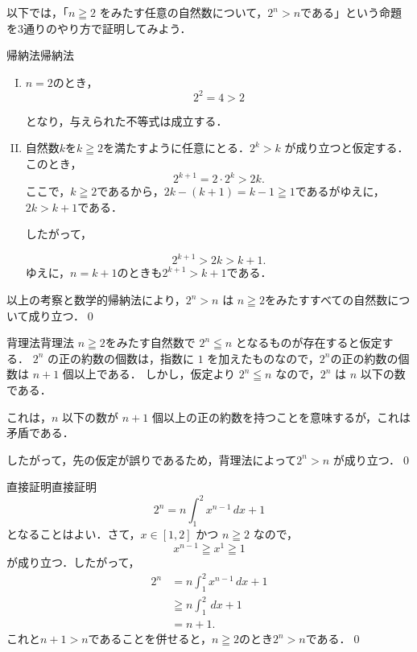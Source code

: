 \documentclass[a4paper,11pt]{ltjsarticle}
\renewcommand{\geq}{\geqq}
\begin{document}
    以下では，「$n \geq 2$ をみたす任意の自然数について，$2^n > n$である」という命題を3通りのやり方で証明してみよう．

    \begin{example}{帰納法}{帰納法}
      \begin{enumerate}[(I)]
      \item $n=2$のとき，
      \[
      2^2 = 4 > 2
      \]
      
      となり，与えられた不等式は成立する．
      \item 自然数$k$を$k \geqq 2$を満たすように任意にとる．$2^k > k$ が成り立つと仮定する．このとき，
      \[
      2^{k+1} = 2 \cdot 2^k > 2k.
      \]
      ここで，$k \geqq 2$であるから，$2k - (k + 1) = k - 1 \geq 1$であるがゆえに，$2k > k + 1$である．
      
      したがって，
      
      \[
      2^{k+1} > 2k > k + 1.
      \]
      ゆえに，$n=k+1$のときも$2^{k+1} > k + 1$である．
      \end{enumerate}
      
      以上の考察と数学的帰納法により，$2^n > n$ は $n \geq 2$をみたすすべての自然数について成り立つ．\qed
      \end{example}

      \begin{example}{背理法}{背理法}
       $n \geqq 2$をみたす自然数で $2^n \leqq n$ となるものが存在すると仮定する．
        $2^n$ の正の約数の個数は，指数に $1$ を加えたものなので，$2^n$の正の約数の個数は $n + 1$ 個以上である．
        しかし，仮定より $2^n \leqq n$ なので，$2^n$ は $n$ 以下の数である．

        これは，$n$ 以下の数が $n + 1$ 個以上の正の約数を持つことを意味するが，これは矛盾である．
        
        したがって，先の仮定が誤りであるため，背理法によって$2^n > n$ が成り立つ．\qed
      \end{example}

      \begin{example}{直接証明}{直接証明}
        \[
        2^n = n \int_{1}^{2} x^{n-1} \, dx + 1 
        \]
        となることはよい．さて，$x \in [1, 2]$ かつ $n \geqq 2$ なので，
        \[
        x^{n-1} \geqq x^{1} \geqq 1
        \]
        が成り立つ．したがって，
        \begin{align*}
        2^n &= n \int_{1}^{2} x^{n-1} \, dx + 1 \\
        & \geqq  n \int_{1}^{2} \, dx +1 \\
        & = n+1.
        \end{align*}
        これと$n+1 >n$であることを併せると，$n \geqq 2$のとき$2^n > n$である．\qed
      \end{example}
\newpage 
\end{document}
